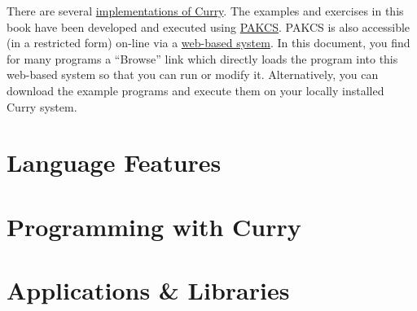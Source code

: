 \documentclass[11pt,fleqn]{report}
\newcommand{\curryurl}{http://www.curry-language.org}
\newcommand{\pakcs}%
  {\href{http://www.informatik.uni-kiel.de/~pakcs}{{\sc PAKCS}}}
\begin{document}
There are several
\href{\curryurl/implementations/overview}{implementations of Curry}.
The examples and exercises in this book have been developed
and executed using \pakcs.
PAKCS is also accessible (in a restricted form) on-line via a
\href{http://www-ps.informatik.uni-kiel.de/smap/}{web-based system}.
In this document, you find for many programs a ``Browse'' link
which directly loads the program into this web-based system so that
you can run or modify it.
Alternatively, you can download the example programs
and execute them on your locally installed Curry system.



\part{Language Features}




\part{Programming with Curry}


\part{Applications \& Libraries}



\newpage
{}



\newpage
{}
\printindex
\end{document}
